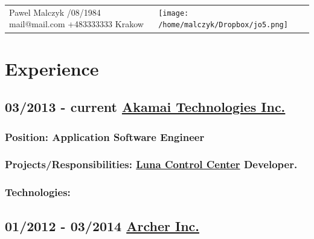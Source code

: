 \documentclass[a4paper]{article}
\begin{document}
\begin{tabular}{  >{\raggedright\arraybackslash}m{10cm}    >{\centering\arraybackslash}m{4cm}  } 
	Pawel Malczyk \newline 21/08/1984 \newline mail@mail.com \newline +483333333 \newline Krakow \newline & \texttt{[image: /home/malczyk/Dropbox/jo5.png]} 
\end{tabular}

\section*{\LARGE{Experience}} 

\subsection*{03/2013 - current \href{http://akamai.com}{Akamai Technologies Inc.}}
\subsubsection*{Position:  \textcolor[RGB]{140,140,140}{Application Software Engineer}}
\subsubsection*{Projects/Responsibilities: \href{http://www.akamai.com/html/technology/luna-control-center.html}{Luna Control Center} Developer.}



\subsubsection*{Technologies:}


\subsection*{01/2012 - 03/2014 \href{http://archermobile.com}{Archer Inc.}}
\end{document}
